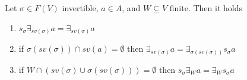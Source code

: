 \documentclass{llncs}
\newcommand{\comment}[1]{}
\begin{document}
\comment{
\begin{remark}
With respect to the notion of diagonal
operators~\cite{xxx}\todo{Manca citazione}, as e.g. adopted in~\cite{jlamp17}, in the present context they are not defined, since in our RePOs we do not have the $\top$ elements.

DIRE DI PIU'
\end{remark}
}

\begin{lemma}
	\label{lemmaSubs0}
	Let $\sigma \in F(V)$ invertible, $a \in A$, and $W \subseteq V$ finite. Then it holds
	\begin{enumerate}
		\item $s_{\sigma} \exists_{sv(\sigma)} a = \exists_{sv(\sigma)} a$
		\item if $\sigma(sv(\sigma)) \cap sv(a) = \emptyset$ then $\exists_{sv(\sigma)} a = \exists_{\sigma(sv(\sigma))} s_{\sigma} a$
		\item if $W \cap (sv(\sigma) \cup \sigma(sv(\sigma))) = \emptyset$ then $s_{\sigma} \exists_W a =  \exists_W s_{\sigma} a$
	\end{enumerate}
\end{lemma}
\end{document}
